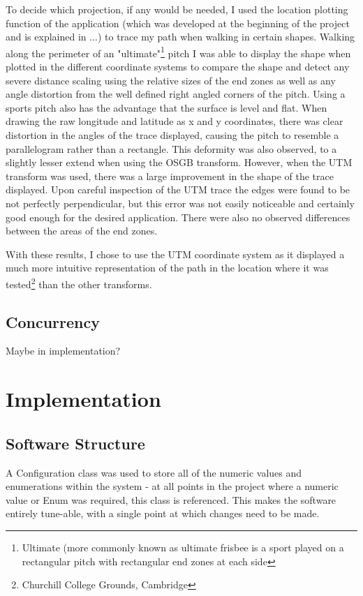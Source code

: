 To decide which projection, if any would be needed, I used the location plotting function of the application (which was developed at the beginning of the project and is explained in ...) to trace my path when walking in certain shapes.
Walking along the perimeter of an "ultimate"\footnote{Ultimate (more commonly known as ultimate frisbee is a sport played on a rectangular pitch with rectangular end zones at each side} pitch I was able to display the shape when plotted in the different coordinate systems to compare the shape and detect any severe distance scaling using the relative sizes of the end zones as well as any angle distortion from the well defined right angled corners of the pitch. Using a sports pitch also has the advantage that the surface is level and flat.
When drawing the raw longitude and latitude as x and y coordinates, there was clear distortion in the angles of the trace displayed, causing the pitch to resemble a parallelogram rather than a rectangle. This deformity was also observed, to a slightly lesser extend when using the OSGB transform. However, when the UTM transform was used, there was a large improvement in the shape of the trace displayed. Upon careful inspection of the UTM trace the edges were found to be not perfectly perpendicular, but this error was not easily noticeable and certainly good enough for the desired application. There were also no observed differences between the areas of the end zones.

With these results, I chose to use the UTM coordinate system as it displayed a much more intuitive representation of the path in the location where it was tested\footnote{Churchill College Grounds, Cambridge} than the other transforms.

\section{Concurrency}

Maybe in implementation?

\cleardoublepage
\chapter{Implementation}

\section{Software Structure}

A Configuration class was used to store all of the numeric values and enumerations within the system - at all points in the project where a numeric value or Enum was required, this class is referenced. This makes the software entirely tune-able, with a single point at which changes need to be made.

